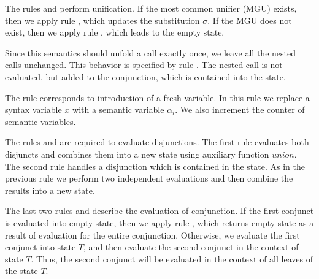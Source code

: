 The rules  and  perform unification. If the most common unifier (MGU) exists, then we apply rule ,
which updates the substitution $\sigma$. If the MGU does not exist, then we apply rule , which leads to the empty state.

Since this semantics should unfold a call exactly once, we leave all the nested calls unchanged. This behavior is specified by rule . The nested call is not evaluated,
but added to the conjunction, which is contained into the state.

The rule  corresponds to introduction of a fresh variable. In this rule we replace a syntax variable $x$ with a semantic variable $\alpha_i$. We also increment
the counter of semantic variables.

The rules  and  are required to evaluate disjunctions. The first rule evaluates both disjuncts and combines them into a new state using auxiliary
function $union$. The second rule handles a disjunction which is contained in the state. As in the previous rule we perform two independent evaluations and then combine the results
into a new state.

The last two rules  and  describe the evaluation of conjunction. If the first conjunct is evaluated into empty state, then we apply rule ,
which returns empty state as a result of evaluation for the entire conjunction. Otherwise, we evaluate the first conjunct into state $T$, and then evaluate the second conjunct in
the context of state $T$. Thus, the second conjunct will be evaluated in the context of all leaves of the state $T$.

